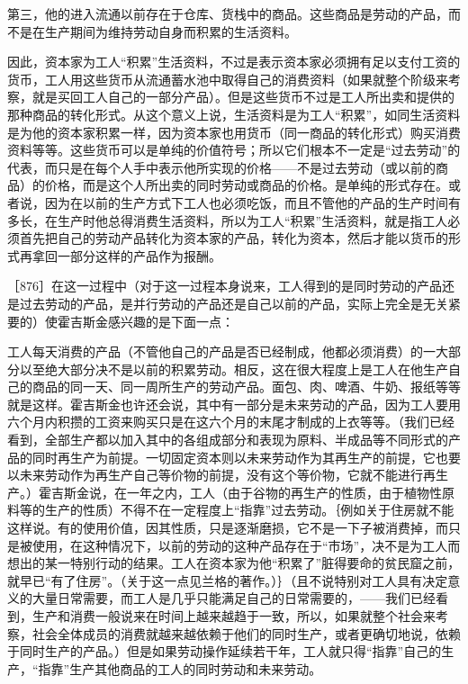 第三，他的进入流通以前存在于仓库、货栈中的商品。这些商品是劳动的产品，而不是在生产期间为维持劳动自身而积累的生活资料。

因此，资本家为工人“积累”生活资料，不过是表示资本家必须拥有足以支付工资的货币，工人用这些货币从流通蓄水池中取得自己的消费资料（如果就整个阶级来考察，就是买回工人自己的一部分产品）。但是这些货币不过是工人所出卖和提供的那种商品的转化形式。从这个意义上说，生活资料是为工人“积累”，如同生活资料是为他的资本家积累一样，因为资本家也用货币（同一商品的转化形式）购买消费资料等等。这些货币可以是单纯的价值符号；所以它们根本不一定是“过去劳动”的代表，而只是在每个人手中表示他所实现的价格——不是过去劳动（或以前的商品）的价格，而是这个人所出卖的同时劳动或商品的价格。是单纯的形式存在。或者说，因为在以前的生产方式下工人也必须吃饭，而且不管他的产品的生产时间有多长，在生产时他总得消费生活资料，所以为工人“积累”生活资料，就是指工人必须首先把自己的劳动产品转化为资本家的产品，转化为资本，然后才能以货币的形式再拿回一部分这样的产品作为报酬。

［876］在这一过程中（对于这一过程本身说来，工人得到的是同时劳动的产品还是过去劳动的产品，是并行劳动的产品还是自己以前的产品，实际上完全是无关紧要的）使霍吉斯金感兴趣的是下面一点：

工人每天消费的产品（不管他自己的产品是否已经制成，他都必须消费）的一大部分以至绝大部分决不是以前的积累劳动。相反，这在很大程度上是工人在他生产自己的商品的同一天、同一周所生产的劳动产品。面包、肉、啤酒、牛奶、报纸等等就是这样。霍吉斯金也许还会说，其中有一部分是未来劳动的产品，因为工人要用六个月内积攒的工资来购买只是在这六个月的末尾才制成的上衣等等。（我们已经看到，全部生产都以加入其中的各组成部分和表现为原料、半成品等不同形式的产品的同时再生产为前提。一切固定资本则以未来劳动作为其再生产的前提，它也要以未来劳动作为再生产自己等价物的前提，没有这个等价物，它就不能进行再生产。）霍吉斯金说，在一年之内，工人（由于谷物的再生产的性质，由于植物性原料等的生产的性质）不得不在一定程度上“指靠”过去劳动。｛例如关于住房就不能这样说。有的使用价值，因其性质，只是逐渐磨损，它不是一下子被消费掉，而只是被使用，在这种情况下，以前的劳动的这种产品存在于“市场”，决不是为工人而想出的某一特别行动的结果。工人在资本家为他“积累了”脏得要命的贫民窟之前，就早已“有了住房”。（关于这一点见兰格的著作。）｝（且不说特别对工人具有决定意义的大量日常需要，而工人是几乎只能满足自己的日常需要的，——我们已经看到，生产和消费一般说来在时间上越来越趋于一致，所以，如果就整个社会来考察，社会全体成员的消费就越来越依赖于他们的同时生产，或者更确切地说，依赖于同时生产的产品。）但是如果劳动操作延续若干年，工人就只得“指靠”自己的生产，“指靠”生产其他商品的工人的同时劳动和未来劳动。

